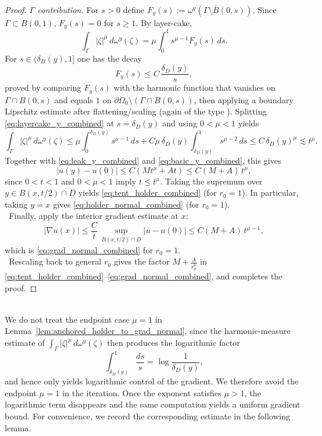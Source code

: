 \documentclass{amsart}
\begin{document}
\begin{proof}
\emph{$\Gamma$ contribution.}
For $s>0$ define $F_y(s):=\omega^y(\Gamma\setminus \overline{B}(0,s))$.
Since $\Gamma\subset B(0,1)$, $F_y(s)=0$ for $s\ge1$.
By layer-cake,
\begin{equation}\label{eq:layercake_y_combined}
\int_{\Gamma}|\zeta|^\mu\,d\omega^y(\zeta)=\mu\int_0^1 s^{\mu-1}F_y(s)\,ds.
\end{equation}
For $s\in(\delta_D(y),1]$ one has the decay
\begin{equation}\label{eq:Fy_decay_combined}
F_y(s)\le C\,\frac{\delta_D(y)}{s},
\end{equation}
proved by comparing $F_y(s)$ with the harmonic function that vanishes on $\Gamma\cap B(0,s)$ and
equals $1$ on $\partial\Omega_0\setminus(\Gamma\cap B(0,s))$, then applying a boundary Lipschitz estimate
after flattening/scaling (again of the type \cite[Corollary~8.36]{GT}).
Splitting \eqref{eq:layercake_y_combined} at $s=\delta_D(y)$ and using $0<\mu<1$ yields
\[
\int_{\Gamma}|\zeta|^\mu\,d\omega^y(\zeta)
\le \mu\int_0^{\delta_D(y)} s^{\mu-1}\,ds
+ C\mu\,\delta_D(y)\int_{\delta_D(y)}^1 s^{\mu-2}\,ds
\le C\,\delta_D(y)^\mu
\lesssim t^\mu.
\]
Together with \eqref{eq:leak_y_combined} and \eqref{eq:basic_y_combined}, this gives
\[
|u(y)-u(0)|\le C(Mt^\mu+At)\le C(M+A)\,t^\mu,
\]
since $0<t<1$ and $0<\mu<1$ imply $t\le t^\mu$. Taking the supremum over $y\in B(x,t/2)\cap D$
yields \eqref{eq:tent_holder_combined} (for $r_0=1$). In particular, taking $y=x$ gives
\eqref{eq:holder_normal_combined} (for $r_0=1$).
\\ \
Finally, apply the interior gradient estimate at $x$:
\[
|\nabla u(x)|\le \frac{C}{t}\,\sup_{B(x,t/2)\cap D}|u-u(0)|
\le C(M+A)\,t^{\mu-1},
\]
which is \eqref{eq:grad_normal_combined} for $r_0=1$.
\\ \
Rescaling back to general $r_0$ gives the factor $M+\frac{A}{r_0^\mu}$ in
\eqref{eq:tent_holder_combined}--\eqref{eq:grad_normal_combined}, and completes the proof.
\end{proof}


\medskip
\noindent \\
We do not treat the endpoint case $\mu=1$ in Lemma~\ref{lem:anchored_holder_to_grad_normal}, since the
harmonic-measure estimate of $\int_{\Gamma}|\zeta|^\mu\,d\omega^y(\zeta)$ then produces the logarithmic factor
\[
\int_{\delta_D(y)}^{1}\frac{ds}{s}=\log\!\frac{1}{\delta_D(y)},
\]
and hence only yields logarithmic control of the gradient. We therefore avoid the endpoint $\mu=1$ in the
iteration. Once the exponent satisfies $\mu>1$, the logarithmic term disappears and the same computation yields
a uniform gradient bound. For convenience, we record the corresponding estimate in the following lemma.
\end{document}
